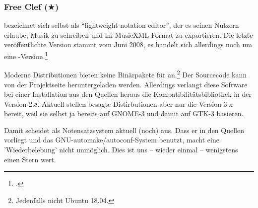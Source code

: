 %
%
%

\subsubsection{Free Clef ($\bigstar$)}

\label{FreeClef} bezeichnet sich selbst als \enquote{lightweight
notation editor}, der es seinen Nutzern erlaube, Musik zu schreiben und im
MusicXML-Format zu exportieren. Die letzte veröffentlichte Version stammt vom
Juni 2008, es handelt sich allerdings noch um eine
-Version.\footcite[vgl.][\nopage wp]{FreeClef2008a}

Moderne Distributionen bieten keine Binärpakete für 
an.\footnote{Jedenfalls nicht Ubuntu 18.04.} Der Sourcecode kann von der
Projektseite heruntergeladen werden. Allerdings verlangt diese Software bei
einer Installation aus den Quellen heraus die Kompatibilitätsbibliothek
 in der Version 2.8. Aktuell stellen besagte Distirbutionen aber
nur die Version 3.x bereit, weil sie selbst ja bereits auf GNOME-3 und damit auf
GTK-3 basieren.

Damit scheidet  als Notensatzsystem aktuell (noch) aus. Dass er
in den Quellen vorliegt und das GNU-automake/autoconf-System benutzt, macht eine
'Wiederbelebung' nicht unmöglich. Dies ist uns -- wieder einmal -- wenigstens
einen Stern wert.



%
